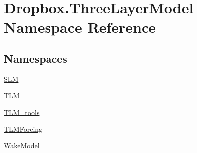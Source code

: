 \hypertarget{namespaceDropbox_1_1ThreeLayerModel}{\section{Dropbox.\+Three\+Layer\+Model Namespace Reference}
\label{namespaceDropbox_1_1ThreeLayerModel}
}
\subsection*{Namespaces}
\begin{DoxyCompactItemize}
\item 
 \hyperlink{namespaceDropbox_1_1ThreeLayerModel_1_1SLM}{S\+L\+M}
\item 
 \hyperlink{namespaceDropbox_1_1ThreeLayerModel_1_1TLM}{T\+L\+M}
\item 
 \hyperlink{namespaceDropbox_1_1ThreeLayerModel_1_1TLM__tools}{T\+L\+M\+\_\+tools}
\item 
 \hyperlink{namespaceDropbox_1_1ThreeLayerModel_1_1TLMForcing}{T\+L\+M\+Forcing}
\item 
 \hyperlink{namespaceDropbox_1_1ThreeLayerModel_1_1WakeModel}{Wake\+Model}
\end{DoxyCompactItemize}
